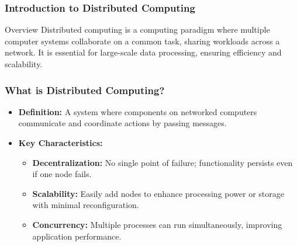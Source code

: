 \documentclass[aspectratio=169]{beamer}
\begin{document}
\frame{\titlepage}

\begin{frame}[fragile]
    \frametitle{Introduction to Distributed Computing}
    \begin{block}{Overview}
        Distributed computing is a computing paradigm where multiple computer systems collaborate on a common task, sharing workloads across a network. 
        It is essential for large-scale data processing, ensuring efficiency and scalability.
    \end{block}
\end{frame}

\begin{frame}[fragile]
    \frametitle{What is Distributed Computing?}
    \begin{itemize}
        \item \textbf{Definition:} A system where components on networked computers communicate and coordinate actions by passing messages.
        \item \textbf{Key Characteristics:}
        \begin{itemize}
            \item \textbf{Decentralization:} No single point of failure; functionality persists even if one node fails.
            \item \textbf{Scalability:} Easily add nodes to enhance processing power or storage with minimal reconfiguration.
            \item \textbf{Concurrency:} Multiple processes can run simultaneously, improving application performance.
        \end{itemize}
    \end{itemize}
\end{frame}
\end{document}
